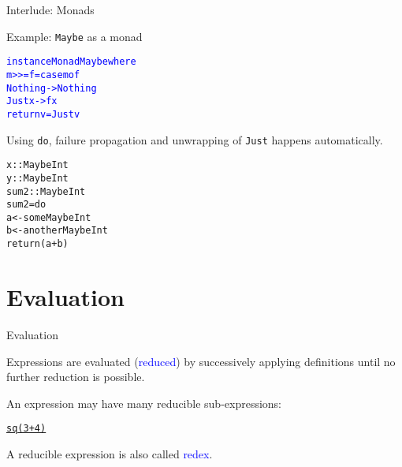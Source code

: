 \documentclass{beamer}
\def\code#1{\texttt{\frenchspacing#1}}
\begin{document}
\begin{frame}[fragile]{Interlude: Monads}

\begin{exampleblock}{Example: \code{Maybe} as a monad}
\begin{alltt}
\textcolor{blue}{instance Monad Maybe where}
  \textcolor{blue}{m >>= f = case m of}
              \textcolor{blue}{Nothing -> Nothing}
              \textcolor{blue}{Just x  -> f x}
  \textcolor{blue}{return v = Just v}
\end{alltt}

\pause

Using \code{do}, failure propagation and unwrapping of \code{Just} happens automatically.

\pause

\begin{alltt}
x :: Maybe Int
y :: Maybe Int
sum2 :: Maybe Int\pause
sum2 = do
  a <- someMaybeInt
  b <- anotherMaybeInt
  return (a + b)
\end{alltt}

\end{exampleblock}

\end{frame}

\section{Evaluation}

\begin{frame}[fragile]{Evaluation}

Expressions are evaluated (\textcolor{blue}{reduced}) by successively applying definitions until no further reduction is possible.

\pause

\vspace{1cm}
An expression may have many reducible sub-expressions:

\begin{alltt}
\centering \underline{sq \underline{(3+4)}}
\end{alltt}

A reducible expression is also called \textcolor{blue}{redex}.

\end{frame}
\end{document}
